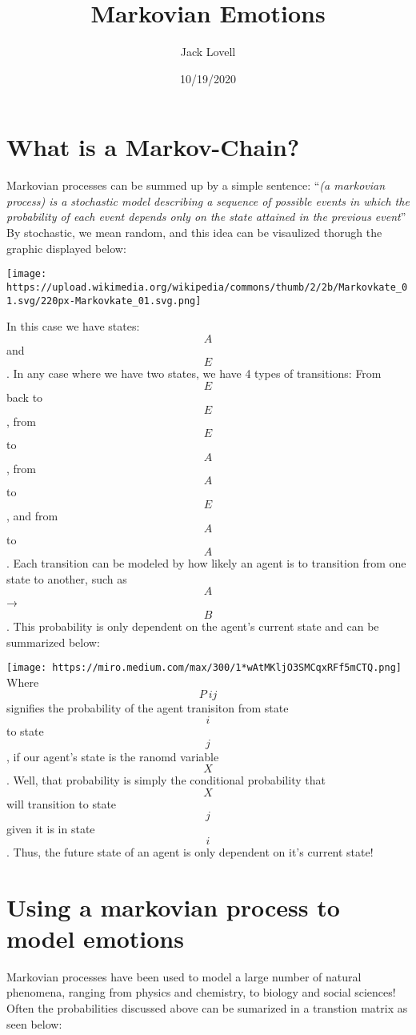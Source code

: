 \documentclass[
]{article}
\title{Markovian Emotions}
\author{Jack Lovell}
\date{10/19/2020}
\begin{document}
\maketitle

\hypertarget{what-is-a-markov-chain}{%
\section{What is a Markov-Chain?}\label{what-is-a-markov-chain}}

Markovian processes can be summed up by a simple sentence: ``\emph{(a
markovian process) is a stochastic model describing a sequence of
possible events in which the probability of each event depends only on
the state attained in the previous event}'' By stochastic, we mean
random, and this idea can be visaulized thorugh the graphic displayed
below:

\texttt{[image: https://upload.wikimedia.org/wikipedia/commons/thumb/2/2b/Markovkate\_01.svg/220px-Markovkate\_01.svg.png]}

In this case we have states: \[A\] and \[E\]. In any case where we have
two states, we have 4 types of transitions: From \[E\] back to \[E\],
from \[E\] to \[A\], from \[A\] to \[E\], and from \[A\] to \[A\]. Each
transition can be modeled by how likely an agent is to transition from
one state to another, such as \[A\] → \[B\]. This probability is only
dependent on the agent's current state and can be summarized below:

\texttt{[image: https://miro.medium.com/max/300/1*wAtMKljO3SMCqxRFf5mCTQ.png]}
Where \[P~ij\] signifies the probability of the agent tranisiton from
state \[i\] to state \[j\], if our agent's state is the ranomd variable
\[X\]. Well, that probability is simply the conditional probability that
\[X\] will transition to state \[j\] given it is in state \[i\]. Thus,
the future state of an agent is only dependent on it's current state!

\hypertarget{using-a-markovian-process-to-model-emotions}{%
\section{Using a markovian process to model
emotions}\label{using-a-markovian-process-to-model-emotions}}

Markovian processes have been used to model a large number of natural
phenomena, ranging from physics and chemistry, to biology and social
sciences! Often the probabilities discussed above can be sumarized in a
transtion matrix as seen below:
\end{document}
